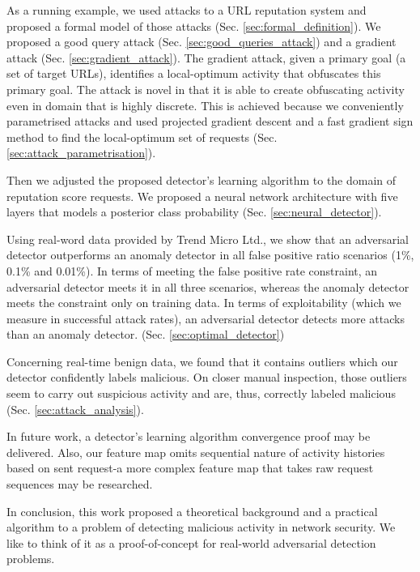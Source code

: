 As a running example, we used attacks to a URL reputation system and proposed a formal model of those attacks (Sec. \ref{sec:formal_definition}). We proposed a good query attack (Sec. \ref{sec:good_queries_attack}) and a gradient attack (Sec. \ref{sec:gradient_attack}). The gradient attack, given a primary goal (a set of target URLs), identifies a local-optimum activity that obfuscates this primary goal. The attack is novel in that it is able to create obfuscating activity even in domain that is highly discrete.
This is achieved because we conveniently parametrised attacks and used projected gradient descent and a fast gradient sign method to find the local-optimum set of requests (Sec. \ref{sec:attack_parametrisation}).

Then we adjusted the proposed detector's learning algorithm to the domain of reputation score requests. We proposed a neural network architecture with five layers that models a posterior class probability (Sec. \ref{sec:neural_detector}).

Using real-word data provided by Trend Micro Ltd., we show that an adversarial detector outperforms an anomaly detector in all false positive ratio scenarios (1\%, 0.1\% and 0.01\%). In terms of meeting the false positive rate constraint, an adversarial detector meets it in all three scenarios, whereas the anomaly detector meets the constraint only on training data. In terms of exploitability (which we measure in successful attack rates), an adversarial detector detects more attacks than an anomaly detector. (Sec. \ref{sec:optimal_detector})

Concerning real-time benign data, we found that it contains outliers which our detector confidently labels malicious. On closer manual inspection, those outliers seem to carry out suspicious activity and are, thus, correctly labeled malicious (Sec. \ref{sec:attack_analysis}).

In future work, a detector's learning algorithm convergence proof may be delivered. Also, our feature map omits sequential nature of activity histories based on sent request-a more complex feature map that takes raw request sequences may be researched.

In conclusion, this work proposed a theoretical background and a practical algorithm to a problem of detecting malicious activity in network security. We like to think of it as a proof-of-concept for real-world adversarial detection problems.

